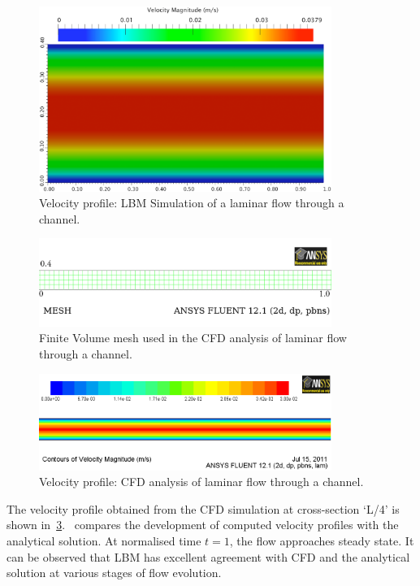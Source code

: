 \begin{figure}[htbp]
	\centering
	\includegraphics[width=0.85\textwidth]{LBM_Poiseuille}
	\caption{Velocity profile: LBM Simulation of a laminar flow through a 
		channel.}
	\label{fig:LBMcontour}
\end{figure}
%
\begin{figure}[htbp]
	\centering
	\includegraphics[width=0.85\textwidth]{CFD_Mesh}
	\caption{Finite Volume mesh used in the CFD analysis of laminar flow 
	through a 
		channel.}
	\label{fig:CFDmesh}
\end{figure}
%
\begin{figure}[htbp]
	\centering
	\includegraphics[width=0.85\textwidth]{CFD_Poiseuille}
	\caption{Velocity profile: CFD analysis of laminar flow through a channel.}
	\label{fig:CFDcontour}
\end{figure}

The velocity profile obtained from the CFD simulation at cross-section `L/4' is 
shown in~\cref{fig:CFDcontour}.~ compares the development of 
computed velocity profiles with the analytical solution. At normalised time $t 
= 1$, the flow approaches steady state. It can be observed that LBM has 
excellent agreement with CFD and the analytical solution at various stages of 
flow evolution.

